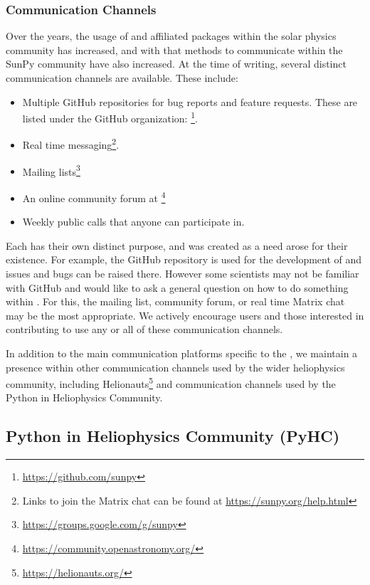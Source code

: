 \subsubsection{Communication Channels}
\label{sssec:communication-channels}

Over the years, the usage of \sunpypkg and affiliated packages within the solar physics community has increased, and with that methods to communicate within the SunPy community have also increased.
At the time of writing, several distinct communication channels are available.
These include:

\begin{itemize}
    \item Multiple GitHub repositories for bug reports and feature requests. These are listed under the \sunpyproj GitHub organization: \footnote{\url{https://github.com/sunpy}}.
    \item Real time messaging\footnote{Links to join the Matrix chat can be found at \url{https://sunpy.org/help.html}}.
    \item Mailing lists\footnote{\url{https://groups.google.com/g/sunpy}}
    \item An online community forum at \footnote{\url{https://community.openastronomy.org/}}
    \item Weekly public calls that anyone can participate in.
\end{itemize}

Each has their own distinct purpose, and was created as a need arose for their existence.
For example, the GitHub repository is used for the development of \sunpypkg and issues and bugs can be raised there.
However some scientists may not be familiar with GitHub and would like to ask a general question on how to do something within \sunpypkg.
For this, the mailing list, community forum, or real time Matrix chat may be the most appropriate.
We actively encourage users and those interested in contributing to use any or all of these communication channels.

In addition to the main communication platforms specific to the \sunpyproj, we maintain a presence within other communication channels used by the wider heliophysics community, including Helionauts\footnote{\url{https://helionauts.org/}} and communication channels used by the Python in Heliophysics Community.

\subsection{Python in Heliophysics Community (PyHC)}
\label{ssec:python-in-heliophysics-community-pyhc}

